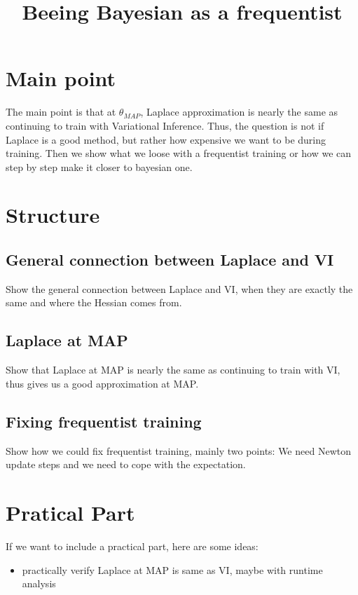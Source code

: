 \documentclass[a4paper]{scrartcl}
\begin{document}
\title{Beeing Bayesian as a frequentist}
\maketitle

\section{Main point}
    The main point is that at $\theta_{MAP}$, Laplace approximation is nearly
    the same as continuing to train with Variational Inference. Thus, the
    question is not if Laplace is a good method, but rather how expensive we
    want to be during training. Then we show what we loose with a frequentist
    training or how we can step by step make it closer to bayesian one.

\section{Structure}
    \subsection{General connection between Laplace and VI}
        Show the general connection between Laplace and VI, when they are
        exactly the same and where the Hessian comes from.

    \subsection{Laplace at MAP}
        Show that Laplace at MAP is nearly the same as continuing to train with
        VI, thus gives us a good approximation at MAP.

    \subsection{Fixing frequentist training}
        Show how we could fix frequentist training, mainly two points: We need
        Newton update steps and we need to cope with the expectation.


\section{Pratical Part}
    If we want to include a practical part, here are some ideas:
    \begin{itemize}
        \item practically verify Laplace at MAP is same as VI, maybe with runtime analysis
    \end{itemize}
\end{document}
